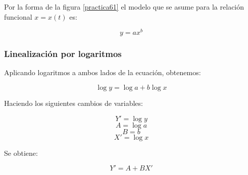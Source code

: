 \documentclass[letter,11pt]{article}
\begin{document}
Por la forma de la figura \ref{practica61} el modelo que se asume para la
relación funcional $x = x(t)$ es:

\begin{equation}
    y = a x^b
\end{equation}

\subsubsection{Linealización por logaritmos}
Aplicando logaritmos a ambos lados de la ecuación, obtenemos:

\begin{equation*}
    \log y = \log a + b \log x
\end{equation*}

Haciendo los siguientes cambios de variables:

\begin{equation*}
    Y' = \log y
\end{equation*}
\begin{equation*}
    A = \log a
\end{equation*}
\begin{equation*}
    B = b
\end{equation*}
\begin{equation*}
    X' = \log x
\end{equation*}

Se obtiene:

\begin{equation*}
    Y' = A + B X'
\end{equation*}
\end{document}

